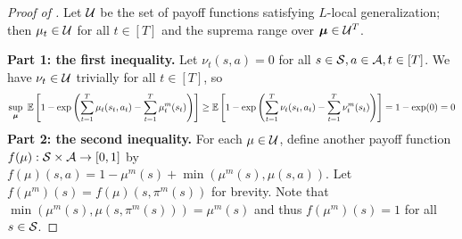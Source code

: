 \begin{proof}[Proof of ]
Let $\mathcal{U}$ be the set of payoff functions satisfying $L$-local generalization; then $\mu_t \in \mathcal{U}$ for all $t \in [T]$ and the suprema range over $\boldsymbol{\mu} \in \mathcal{U}^T$.

\textbf{Part 1: the first inequality.} Let $\nu_t(s,a) = 0$ for all $s\in \mathcal{S}, a \in \mathcal{A}, t \in [T]$. We have $\nu_t \in \mathcal{U}$ trivially for all $t \in [T]$, so
\[
\sup_{\boldsymbol{\mu}}\ \operatorname*{\mathbb{E}}\left[1-\exp \left(\sum_{t=1}^T \mu_t(s_t,a_t) -\sum_{t=1}^T \mu_t^m(s_t) \right)\right] \ge  \operatorname*{\mathbb{E}}\left[1-\exp \left(\sum_{t=1}^T \nu_t(s_t,a_t) -\sum_{t=1}^T \nu_t^m(s_t) \right)\right] = 1 - \exp(0) = 0
\]
\textbf{Part 2: the second inequality.} For each $\mu \in \mathcal{U}$, define another payoff function $f(\mu): \mathcal{S} \times \mathcal{A} \to [0,1]$ by $f(\mu)(s,a) = 1 - \mu^m(s) + \min(\mu^m(s), \mu(s,a))$. Let $f(\mu^m)(s) = f(\mu)(s,\pi^m(s))$ for brevity. Note that $\min(\mu^m(s), \mu(s,\pi^m(s))) = \mu^m(s)$ and thus $f(\mu^m)(s) = 1 $ for all $s \in \mathcal{S}$.


\end{proof}
